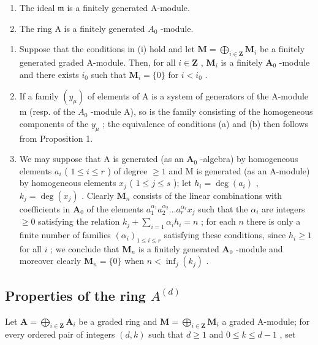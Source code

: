 \begin{enumerate}
\def\labelenumi{(\alph{enumi})}
\item
  The ideal \(\mathfrak{m}\) is a finitely generated A-module.
\item
  The ring A is a finitely generated \(A_{0}\) -module.
\end{enumerate}

\begin{enumerate}
\def\labelenumi{(\roman{enumi})}
\setcounter{enumi}{1}
\item
  Suppose that the conditions in (i) hold and let \(\mathbf{M} = \bigoplus_{i\in \mathbf{Z}}\mathbf{M}_i\) be a finitely generated graded A-module. Then, for all \(i\in \mathbf{Z}\) , \(\mathbf{M}_i\) is a finitely \(\mathbf{A}_0\) -module and there exists \(i_0\) such that \(\mathbf{M}_i = \{0\}\) for \(i < i_0\) .
\item
  If a family \((y_{\mu})\) of elements of A is a system of generators of the A-module m (resp. of the \(A_{0}\) -module A), so is the family consisting of the homogeneous components of the \(y_{\mu}\) ; the equivalence of conditions (a) and (b) then follows from Proposition 1.
\item
  We may suppose that A is generated (as an \(\mathbf{A}_0\) -algebra) by homogeneous elements \(a_i\) ( \(1 \leqslant i \leqslant r\) ) of degree \(\geqslant 1\) and M is generated (as an A-module) by homogeneous elements \(x_j\) ( \(1 \leqslant j \leqslant s\) ); let \(h_i = \deg(a_i)\) , \(k_j = \deg(x_j)\) . Clearly \(\mathbf{M}_n\) consists of the linear combinations with coefficients in \(\mathbf{A}_0\) of the elements \(a_1^{\alpha_1} a_2^{\alpha_2} \ldots a_r^{\alpha_r} x_j\) such that the \(\alpha_i\) are integers \(\geqslant 0\) satisfying the relation \(k_j + \sum_{i=1} \alpha_i h_i = n\) ; for each \(n\) there is only a finite number of families \((\alpha_i)_{1 \leqslant i \leqslant r}\) satisfying these conditions, since \(h_i \geqslant 1\) for all \(i\) ; we conclude that \(\mathbf{M}_n\) is a finitely generated \(\mathbf{A}_0\) -module and moreover clearly \(\mathbf{M}_n = \{0\}\) when \(n < \inf_{j}(k_j)\) .
\end{enumerate}

\subsection{\texorpdfstring{Properties of the ring \(A^{(d)}\)}{Properties of the ring A(d)}}

Let \(\mathbf{A} = \bigoplus_{i\in \mathbf{Z}}\mathbf{A}_i\) be a graded ring and \(\mathbf{M} = \bigoplus_{i\in \mathbf{Z}}\mathbf{M}_i\) a graded A-module; for every ordered pair of integers \((d, k)\) such that \(d \geqslant 1\) and \(0 \leqslant k \leqslant d - 1\) , set

